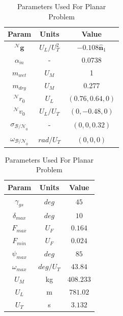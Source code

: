 \begin{table}[ht]
\caption{Parameters Used For Planar Problem}
\centering 
\begin{tabular}{c c c} 
\hline\hline
Param & Units & Value \\ [0.5ex] 
\hline 
$^\mathcal{N}\mathbf{g}$    & $U_L/U_T^2$   & $-0.108\hat{\mathbf{n}}_1$  \\ 
$\alpha_{\dot{m}}$        & -       & 0.0738  \\
$m_{wet}$             & $U_M$     & 1  \\
$m_{dry}$             & $U_M$     & 0.277  \\
$^\mathcal{N}r_{0}$       & $U_L$     & $(0.76,0.64,0)$  \\
$^\mathcal{N}v_{0}$       & $U_L/U_T$   & $(0,-0.48,0)$  \\
$\sigma_{\mathcal{B/N}_0}$    & -     & $(0,0,0.32)$  \\
$\omega_{\mathcal{B/N}_0}$    & $rad/U_T$   & $(0,0,0)$ \\[1ex] 
\hline
\end{tabular}
\begin{tabular}{c c c} 
\hline\hline
Param & Units & Value \\ [0.5ex] 
\hline 
$\gamma_{gs}$           & $deg$     & $45$  \\ 
$\delta_{max}$          & $deg$     & $10$  \\
$F_{max}$             & $U_F$     & $0.164$ \\
$F_{min}$             & $U_F$     & $0.024$  \\
$\psi_{max}$          & $deg$     & $85$  \\
$\omega_{max}$          & $deg/U_T$   & $43.84$  \\
$U_M$               & kg      & $408.233$  \\
$U_L$             & m       & $781.02$ \\
$U_T$             & s       & $3.132$ \\[1ex] 
\hline
\end{tabular}
\label{table:tableplanar}
\end{table}


